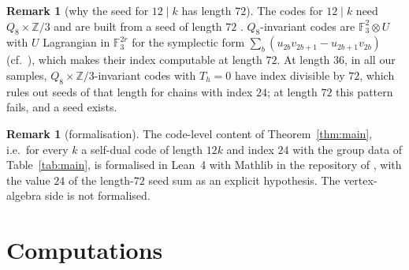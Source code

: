 \documentclass[11pt]{amsart}
\theoremstyle{definition}
\newtheorem{remark}[theorem]{Remark}
\newcommand{\F}{\mathbb{F}_3}
\newcommand{\Z}{\mathbb{Z}}
\begin{document}
\begin{remark}[why the seed for $12\mid k$ has length $72$]
The codes for $12\mid k$ need $Q_8\times\Z/3$ and are built from a seed of length $72$
\cite[\S7.3]{I}. $Q_8$-invariant codes are $\F^2\otimes U$ with $U$ Lagrangian in $\F^{2r}$ for the
symplectic form $\sum_b(u_{2b}v_{2b+1}-u_{2b+1}v_{2b})$ (cf.\ \cite[App.~A.2]{I}), which makes their index
computable at length $72$. At length $36$, in all our samples, $Q_8\times\Z/3$-invariant codes with
$T_h=0$ have index divisible by $72$, which rules out seeds of that length for chains with index $24$;
at length $72$ this pattern fails, and a seed exists.
\end{remark}

\begin{remark}[formalisation]
The code-level content of Theorem~\ref{thm:main}, i.e.\ for every $k$ a self-dual code of length $12k$ and
index $24$ with the group data of Table~\ref{tab:main}, is formalised in Lean~4 with Mathlib in the
repository of \cite{I}, with the value $24$ of the length-$72$ seed sum as an explicit hypothesis. The
vertex-algebra side is not formalised.
\end{remark}

\appendix
\section{Computations}\label{app:checks}
\end{document}
